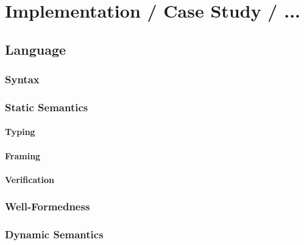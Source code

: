 \chapter{Implementation / Case Study / ...}

\section{Language}
\label{sec:language}


    \subsection{Syntax}
    \label{sec:syntax}
    
    
    \subsection{Static Semantics}
    \label{sec:static-semantics}
    
    
    \subsubsection{Typing}
    \label{sssec:typing}
    
    
    \subsubsection{Framing}
    \label{sssec:framing}
    
    
    \subsubsection{Verification}
    \label{sssec:verification}
    
    
    \subsection{Well-Formedness}
    \label{sec:well-formedness}
    
    
    \subsection{Dynamic Semantics}
    \label{ssec:dynamic-semantics}
    
    
